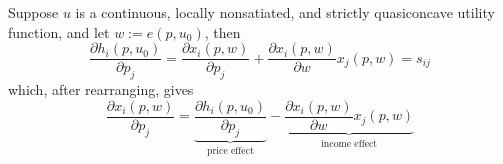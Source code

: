\begin{prop}
  Suppose $u$ is a continuous, locally nonsatiated, and strictly
  quasiconcave utility function, and let $w := e(p, u_0)$, then
  \[
  \frac{\partial h_i (p, u_0)}{\partial p_j}
  = \frac{\partial x_i(p,w)}{\partial p_j}
  + \frac{\partial x_i(p,w)}{\partial w} x_j(p,w) 
  = s_{ij}
  \]
  which, after rearranging, gives
  \[
  \frac{\partial x_i(p,w)}{\partial p_j} 
  = \underbrace{\frac{\partial h_i (p, u_0)}{\partial p_j}}_{\text{price effect}}
  - \underbrace{\frac{\partial x_i(p,w)}{\partial w} x_j(p,w)}_{\text{income effect}}
  \]
\end{prop}
